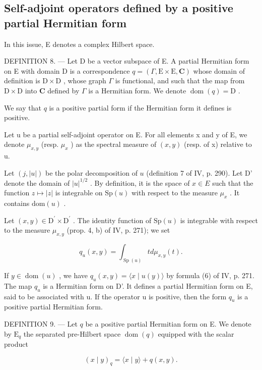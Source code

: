 \subsection{Self-adjoint operators defined by a positive partial Hermitian form}

In this issue, E denotes a complex Hilbert space.

DEFINITION 8. --- Let D be a vector subspace of E. A partial Hermitian form on E with domain D is a correspondence \(q = (\Gamma, \mathrm{E} \times \mathrm{E}, \mathbf{C})\) whose domain of definition is \(\mathrm{D} \times \mathrm{D}\) , whose graph \(\Gamma\) is functional, and such that the map from \(\mathrm{D} \times \mathrm{D}\) into \(\mathbf{C}\) defined by \(\Gamma\) is a Hermitian form. We denote \(\operatorname{dom}(q) = \mathrm{D}\) .

We say that \(q\) is a positive partial form if the Hermitian form it defines is positive.

Let u be a partial self-adjoint operator on E. For all elements x and y of E, we denote \(\mu_{x,y}\) (resp. \(\mu_{x}\) ) as the spectral measure of \((x,y)\) (resp. of x) relative to u.

Let \((j, |u|)\) be the polar decomposition of \(u\) (definition 7 of IV, p. 290). Let D' denote the domain of \(|u|^{1/2}\) . By definition, it is the space of \(x \in E\) such that the function \(z \mapsto |z|\) is integrable on \(\mathrm{Sp}(u)\) with respect to the measure \(\mu_x\) . It contains \(\mathrm{dom}(u)\) .

Let \((x,y)\in\mathrm{D}^{\prime}\times\mathrm{D}^{\prime}\) . The identity function of \(\mathrm{Sp}(u)\) is integrable with respect to the measure \(\mu_{x,y}\) (prop. 4, b) of IV, p. 271); we set

\[
q _ {u} (x, y) = \int_ {\operatorname{Sp} (u)} t d \mu_ {x, y} (t).
\]

If \(y \in \operatorname{dom}(u)\) , we have \(q_u(x, y) = \langle x \mid u(y) \rangle\) by formula (6) of IV, p. 271. The map \(q_u\) is a Hermitian form on D'. It defines a partial Hermitian form on E, said to be associated with u. If the operator u is positive, then the form \(q_u\) is a positive partial Hermitian form.

DEFINITION 9. --- Let \(q\) be a positive partial Hermitian form on E. We denote by \(\mathrm{E}_q\) the separated pre-Hilbert space \(\operatorname{dom}(q)\) equipped with the scalar product

\[
(x \mid y) _ {q} = \langle x \mid y \rangle + q (x, y).
\]

